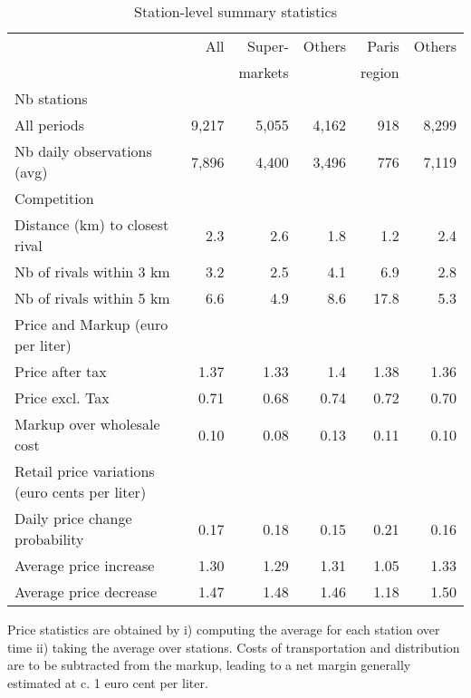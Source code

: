 \documentclass[english]{article}
\begin{document}
\begin{table}[H]
\begin{threeparttable}
\renewcommand{\arraystretch}{0.8} %
\caption{Station-level summary statistics}
\label{tab:station_stats_des}
\begin{tabular}{lr|rr|rr}
    \hline
    \hline
		{}          & All   & Super-   & Others & Paris  & Others \\
    {}          &       & markets  &        & region & \\
    \hline
    Nb stations &       &       &       &       &  \\
    All periods & 9,217 & 5,055  & 4,162  & 918   & 8,299 \\
    Nb daily observations (avg) & 7,896  & 4,400  & 3,496  & 776   & 7,119 \\
		\hline
    Competition &       &       &       &       &  \\
    Distance (km) to closest rival & 2.3  & 2.6  & 1.8  & 1.2  & 2.4 \\
    Nb of rivals within 3 km       & 3.2  & 2.5  & 4.1  & 6.9  & 2.8 \\
    Nb of rivals within 5 km       & 6.6  & 4.9  & 8.6  & 17.8 & 5.3 \\
    \hline
    Price and Markup (euro per liter) &       &       &       &       &  \\
    Price after tax            & 1.37  & 1.33  & 1.4   & 1.38  & 1.36 \\
    Price excl. Tax            & 0.71  & 0.68  & 0.74  & 0.72  & 0.70 \\
    Markup over wholesale cost & 0.10  & 0.08  & 0.13  & 0.11  & 0.10 \\
    \hline
    Retail price variations (euro cents per liter) &       &       &       &       &  \\
    Daily price change probability & 0.17  & 0.18  & 0.15  & 0.21  & 0.16 \\
    Average price increase         & 1.30   & 1.29  & 1.31  & 1.05  & 1.33 \\
    Average price decrease         & 1.47   & 1.48  & 1.46  & 1.18  & 1.50 \\
    \hline
    \hline
\end{tabular}
\begin{tablenotes}
			\small
      \item Price statistics are obtained by i) computing the average for each station over time ii) taking the average over stations. Costs of transportation and distribution are to be subtracted from the markup, leading to a net margin generally estimated at c. 1 euro cent per liter.
\end{tablenotes}
\end{threeparttable}
\end{table}
\end{document}
